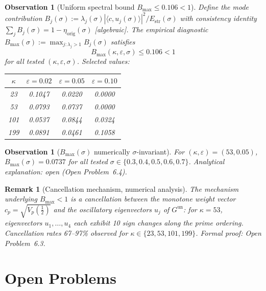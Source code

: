 \documentclass[11pt]{article}
\newtheorem{observation}[theorem]{Observation}
\newtheorem*{remark}{Remark}
\newcommand{\Estr}{E_{\mathrm{str}}}
\newcommand{\etaorig}{\eta_{\mathrm{orig}}}
\newcommand{\Gun}{G^{\mathrm{un}}}
\begin{document}
\begin{observation}[Uniform spectral bound $B_{\max}\leq 0.106<1$]
Define the mode contribution
$B_j(\sigma):=\lambda_j(\sigma)|\langle c,u_j(\sigma)\rangle|^2/\Estr(\sigma)$
with consistency identity $\sum_j B_j(\sigma)=1-\etaorig(\sigma)$ [algebraic].
The empirical diagnostic $B_{\max}(\sigma):=\max_{j:\lambda_j>1}B_j(\sigma)$
satisfies
\[
B_{\max}(\kappa,\varepsilon,\sigma)\leq 0.106<1
\]
for all tested $(\kappa,\varepsilon,\sigma)$. Selected values:

\begin{center}
\begin{tabular}{cccc}
\toprule
$\kappa$ & $\varepsilon=0.02$ & $\varepsilon=0.05$ & $\varepsilon=0.10$ \\
\midrule
23  & 0.1047 & 0.0220 & 0.0000 \\
53  & 0.0793 & 0.0737 & 0.0000 \\
101 & 0.0537 & 0.0844 & 0.0324 \\
199 & 0.0891 & 0.0461 & 0.1058 \\
\bottomrule
\end{tabular}
\end{center}
\end{observation}

\begin{observation}[$B_{\max}(\sigma)$ numerically $\sigma$-invariant]
For $(\kappa,\varepsilon)=(53,0.05)$, $B_{\max}(\sigma)=0.0737$ for all
tested $\sigma\in\{0.3,0.4,0.5,0.6,0.7\}$. Analytical explanation: open
(Open Problem~6.4).
\end{observation}

\begin{remark}[Cancellation mechanism, numerical analysis]
The mechanism underlying $B_{\max}<1$ is a cancellation between the monotone
weight vector $c_p=\sqrt{V_p({\textstyle\frac12})}$ and the oscillatory eigenvectors $u_j$
of $\Gun$: for $\kappa=53$, eigenvectors $u_1,\ldots,u_4$ each exhibit 10
sign changes along the prime ordering. Cancellation rates 67--97\% observed
for $\kappa\in\{23,53,101,199\}$. Formal proof: Open Problem~6.3.
\end{remark}

\section{Open Problems}
\end{document}

